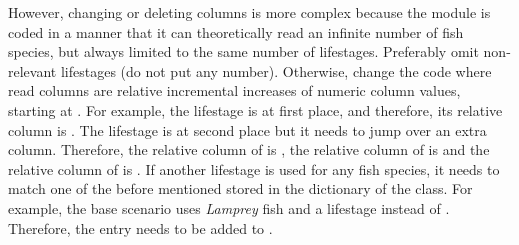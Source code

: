However, changing or deleting columns is more complex because the module is coded in a manner that it can theoretically read an infinite number of fish species, but always limited to the same number of lifestages. Preferably omit non-relevant lifestages (do not put any number). Otherwise, change the code where read columns are relative incremental increases of numeric column values, starting at . For example, the  lifestage is at first place, and therefore, its relative column is . The  lifestage is at second place but it needs to jump over an extra  column. Therefore, the relative column of  is , the relative column of  is  and the relative column of  is . If another lifestage is used for any fish species, it needs to match one of the before mentioned stored in the  dictionary of the  class. For example, the base scenario uses \textit{Lamprey} fish and a  lifestage instead of . Therefore, the entry  needs to be added to .


